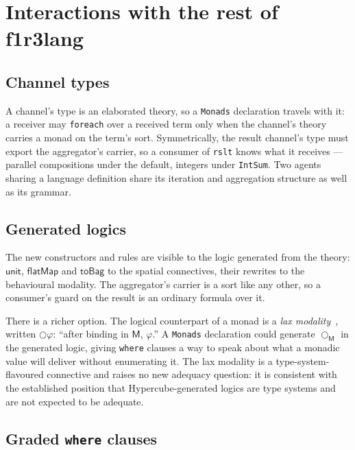 \documentclass[11pt]{article}
\theoremstyle{branddef}
\theoremstyle{brandplain}
\theoremstyle{brandrem}
\newcommand{\M}{\mathsf{M}}
\newcommand{\unit}{\mathsf{unit}}
\newcommand{\bind}{\mathsf{flatMap}}
\newcommand{\lax}{\bigcirc}
\newcommand{\fe}{\texttt{foreach}}
\newcommand{\flang}{\textsf{f1r3lang}}
\begin{document}
\section{Interactions with the rest of \flang{}}
\label{sec:interactions}

\subsection{Channel types}

A channel's type is an elaborated theory, so a \texttt{Monads} declaration
travels with it: a receiver may \fe{} over a received term only when the
channel's theory carries a monad on the term's sort. Symmetrically, the result
channel's type must export the aggregator's carrier, so a consumer of
\texttt{rslt} knows what it receives --- parallel compositions under the default,
integers under \texttt{IntSum}. Two agents sharing a language definition share
its iteration and aggregation structure as well as its grammar.

\subsection{Generated logics}
\label{sec:logic}

The new constructors and rules are visible to the logic generated from the
theory: \(\unit\), \(\bind\) and \(\mathsf{toBag}\) to the spatial connectives,
their rewrites to the behavioural modality. The aggregator's carrier is a sort
like any other, so a consumer's guard on the result is an ordinary formula over
it.

There is a richer option. The logical counterpart of a monad is a \emph{lax
modality}~\cite{FairtloughMendler97, BentonBiermanDePaiva98}, written
\(\lax\varphi\): ``after binding in \(\M\), \(\varphi\).'' A \texttt{Monads}
declaration could generate \(\lax_\M\) in the generated logic, giving
\texttt{where} clauses a way to speak about what a monadic value will deliver
without enumerating it. The lax modality is a type-system-flavoured connective
and raises no new adequacy question: it is consistent with the established
position that Hypercube-generated logics are type systems and are not expected
to be adequate.

\subsection{Graded \texttt{where} clauses}
\label{sec:graded}
\end{document}
